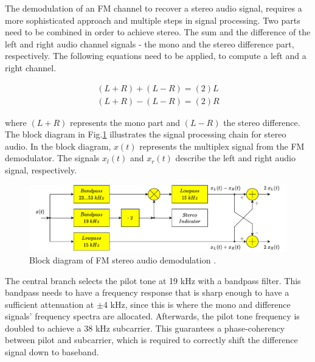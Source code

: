 The demodulation of an FM channel to recover a stereo audio signal, requires a more sophisticated approach and multiple steps in signal processing.
Two parts need to be combined in order to achieve stereo.
The sum and the difference of the left and right audio channel signals - the mono and the stereo difference part, respectively.
The following equations need to be applied, to compute a left and a right channel.

\begin{equation}
  \begin{split}
    (L+R) + (L-R) = (2)L \\
    (L+R) - (L-R) = (2)R
    \label{equ_stereo_from_sum_diff}
  \end{split}
\end{equation}

where $(L+R)$ represents the mono part and $(L-R)$ the stereo difference.\\

The block diagram in Fig.\ref{fig_bd_stereo_demod} illustrates the signal processing chain for stereo audio.
In the block diagram, $x(t)$ represents the multiplex signal from the FM demodulator.
The signals $x_l(t)$ and $x_r(t)$ describe the left and right audio signal, respectively.\\

\begin{figure}[!h]
  \centering
    \includegraphics[width=1.0\textwidth]{img/draw.io/bd_fm_demod_stereo_audio}
  \caption{Block diagram of FM stereo audio demodulation \cite{ref_roppel}.}
  \label{fig_bd_stereo_demod}
\end{figure}

The central branch selects the pilot tone at 19 kHz with a bandpass filter.
This bandpass needs to have a frequency response that is sharp enough to have a sufficient attenuation at $\pm$4 kHz, since this is where the mono and difference signals' frequency spectra are allocated.
Afterwards, the pilot tone frequency is doubled to achieve a 38 kHz subcarrier.
This guarantees a phase-coherency between pilot and subcarrier, which is required to correctly shift the difference signal down to baseband.

